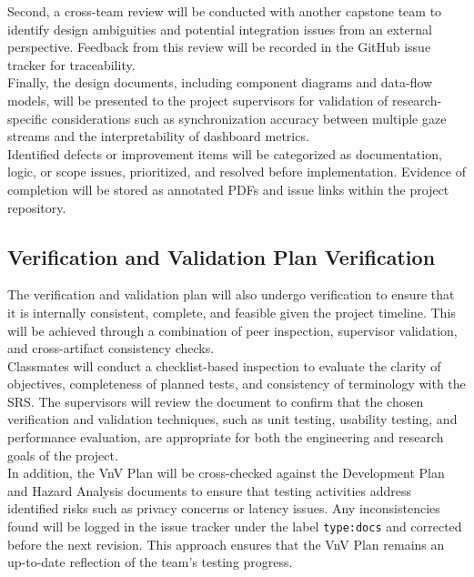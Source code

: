 \documentclass[12pt, titlepage]{article}
\begin{document}
Second, a cross-team review will be conducted with another capstone team to identify design ambiguities and potential integration issues from an external perspective. Feedback from this review will be recorded in the GitHub issue tracker for traceability.\\

Finally, the design documents, including component diagrams and data-flow models, will be presented to the project supervisors for validation of research-specific considerations such as synchronization accuracy between multiple gaze streams and the interpretability of dashboard metrics.\\

Identified defects or improvement items will be categorized as documentation, logic, or scope issues, prioritized, and resolved before implementation. Evidence of completion will be stored as annotated PDFs and issue links within the project repository.\\

\subsection{Verification and Validation Plan Verification}

The verification and validation plan will also undergo verification to ensure that it is internally consistent, complete, and feasible given the project timeline. This will be achieved through a combination of peer inspection, supervisor validation, and cross-artifact consistency checks.\\

Classmates will conduct a checklist-based inspection to evaluate the clarity of objectives, completeness of planned tests, and consistency of terminology with the SRS. The supervisors will review the document to confirm that the chosen verification and validation techniques, such as unit testing, usability testing, and performance evaluation, are appropriate for both the engineering and research goals of the project.\\

In addition, the VnV Plan will be cross-checked against the Development Plan and Hazard Analysis documents to ensure that testing activities address identified risks such as privacy concerns or latency issues. Any inconsistencies found will be logged in the issue tracker under the label \texttt{type:docs} and corrected before the next revision. This approach ensures that the VnV Plan remains an up-to-date reflection of the team’s testing progress.\\
\end{document}
